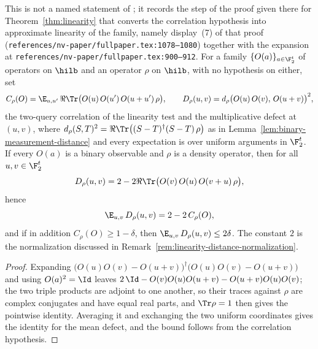 \begin{lemma}
	\label{lem:blr-defect-identity}
	\leanok
	This is not a named statement of \cite{Natarajan2017Linearity}; it records
	the step of the proof given there for Theorem~\ref{thm:linearity} that
	converts the correlation hypothesis into approximate linearity of the
	family, namely display~(7) of that proof
	(\texttt{references/nv-paper/fullpaper.tex:1078--1080}) together with the
	expansion at \texttt{references/nv-paper/fullpaper.tex:900--912}. For a
	family $\{O(a)\}_{a \in \F_2^t}$ of operators on $\hilb$ and an operator
	$\rho$ on $\hilb$, with no hypothesis on either, set
	\[
		C_\rho(O) = \E_{u,u'} \, \Re \Tr\big(O(u) \, O(u') \,
		O(u+u') \, \rho\big) ,
		\qquad
		D_\rho(u,v) = d_\rho\big(O(u) \, O(v), \, O(u+v)\big)^2 ,
	\]
	the two-query correlation of the linearity test and the multiplicative
	defect at $(u,v)$, where
	$d_\rho(S,T)^2 = \Re \Tr\big((S-T)^\dagger (S-T) \, \rho\big)$ as in
	Lemma~\ref{lem:binary-measurement-distance} and every expectation is over
	uniform arguments in $\F_2^t$. If every $O(a)$ is a binary observable and
	$\rho$ is a density operator, then for all $u, v \in \F_2^t$
	\[
		D_\rho(u,v) = 2 - 2 \Re \Tr\big(O(v) \, O(u) \, O(v+u) \, \rho\big) ,
	\]
	hence
	\[
		\E_{u,v} \, D_\rho(u,v) = 2 - 2 \, C_\rho(O) ,
	\]
	and if in addition $C_\rho(O) \ge 1 - \delta$, then
	$\E_{u,v} \, D_\rho(u,v) \le 2\delta$. The constant $2$ is the
	normalization discussed in
	Remark~\ref{rem:linearity-distance-normalization}.
\end{lemma}
\begin{proof}
	\leanok
	Expanding
	$\big(O(u) O(v) - O(u+v)\big)^\dagger \big(O(u) O(v) - O(u+v)\big)$ and
	using $O(a)^2 = \Id$ leaves
	$2 \, \Id - O(v) O(u) O(u+v) - O(u+v) O(u) O(v)$; the two triple products
	are adjoint to one another, so their traces against $\rho$ are complex
	conjugates and have equal real parts, and $\Tr \rho = 1$ then gives the
	pointwise identity. Averaging it and exchanging the two uniform
	coordinates gives the identity for the mean defect, and the bound follows
	from the correlation hypothesis.
\end{proof}

